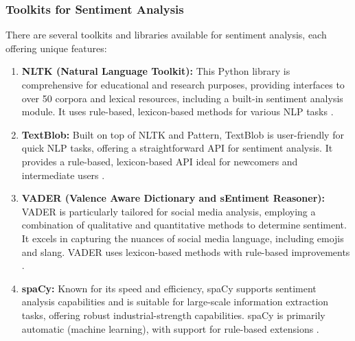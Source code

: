 \subsubsection{Toolkits for Sentiment Analysis}
There are several toolkits and libraries available for sentiment analysis, each offering unique features:
\begin{enumerate}
    \item \textbf{NLTK (Natural Language Toolkit):} This Python library is comprehensive for educational and research purposes, providing interfaces to over 50 corpora and lexical resources, including a built-in sentiment analysis module. It uses rule-based, lexicon-based methods for various NLP tasks \cite{BirdKleinLoper09}.
    \item \textbf{TextBlob:} Built on top of NLTK and Pattern, TextBlob is user-friendly for quick NLP tasks, offering a straightforward API for sentiment analysis. It provides a rule-based, lexicon-based API ideal for newcomers and intermediate users \cite{loria2018textblob}.
    \item \textbf{VADER (Valence Aware Dictionary and sEntiment Reasoner):} VADER is particularly tailored for social media analysis, employing a combination of qualitative and quantitative methods to determine sentiment. It excels in capturing the nuances of social media language, including emojis and slang. VADER uses lexicon-based methods with rule-based improvements \cite{hutto2014vader}.
    \item \textbf{spaCy:} Known for its speed and efficiency, spaCy supports sentiment analysis capabilities and is suitable for large-scale information extraction tasks, offering robust industrial-strength capabilities. spaCy is primarily automatic (machine learning), with support for rule-based extensions \cite{honnibal2017spacy}.
\end{enumerate}

